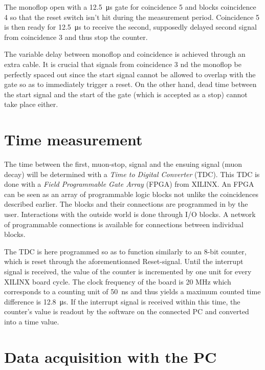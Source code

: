 The monoflop open with a \SI{12.5}{\micro\second} gate for coincidence 5 and blocks coincidence 4 so that the reset switch isn't hit during the measurement period. Coincidence 5 is then ready for \SI{12.5}{\micro\second} to receive the second, supposedly delayed second signal from coincidence 3 and thus stop the counter.

The variable delay between monoflop and coincidence is achieved through an extra cable. It is crucial that signals from coincidence 3 nd the monoflop be perfectly spaced out since the start signal cannot be allowed to overlap with the gate so as to immediately trigger a reset. On the other hand, dead time between the start signal and the start of the gate (which is accepted as a stop) cannot take place either.

\section{Time measurement}

The time between the first, muon-stop, signal and the ensuing signal (muon decay) will be determined with a \textit{Time to Digital Converter} (TDC). This TDC is done with a \textit{Field Programmable Gate Array} (FPGA) from XILINX. An FPGA can be seen as an array of programmable logic blocks not unlike the coincidences described earlier. The blocks and their connections are programmed in by the user. Interactions with the outside world is done through I/O blocks. A network of programmable connections is available for connections between individual blocks.

The TDC is here programmed so as to function similarly to an 8-bit counter, which is reset through the aforementionned Reset-signal. Until the interrupt signal is received, the value of the counter is incremented by one unit for every XILINX board cycle. The clock frequency of the board is 20 MHz which corresponds to a counting unit of \SI{50}{\nano\second} and thus yields a maximum counted time difference is \SI{12.8}{\micro\second}. If the interrupt signal is received within this time, the counter's value is readout by the software on the connected PC	and converted into a time value.


\section{Data acquisition with the PC}

